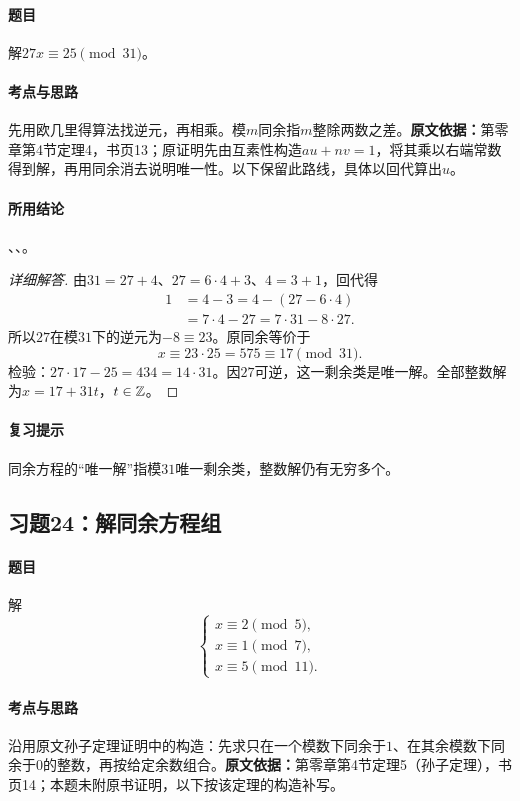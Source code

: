 \paragraph{题目}解$27x\equiv25\pmod{31}$。
\paragraph{考点与思路}先用欧几里得算法找逆元，再相乘。模$m$同余指$m$整除两数之差。\textbf{原文依据：}第零章第4节定理4，书页13；原证明先由互素性构造$au+nv=1$，将其乘以右端常数得到解，再用同余消去说明唯一性。以下保留此路线，具体以回代算出$u$。
\paragraph{所用结论}、、。
\begin{proof}[详细解答]
由$31=27+4$、$27=6\cdot4+3$、$4=3+1$，回代得
\begin{align*}
1&=4-3=4-(27-6\cdot4)\\
 &=7\cdot4-27=7\cdot31-8\cdot27.
\end{align*}
所以$27$在模$31$下的逆元为$-8\equiv23$。原同余等价于
\[
x\equiv23\cdot25=575\equiv17\pmod{31}.
\]
检验：$27\cdot17-25=434=14\cdot31$。因$27$可逆，这一剩余类是唯一解。全部整数解为$x=17+31t$，$t\in\mathbb Z$。
\end{proof}
\paragraph{复习提示}同余方程的“唯一解”指模$31$唯一剩余类，整数解仍有无穷多个。

\subsection{习题24：解同余方程组}\label{exercise:0:24}
\paragraph{题目}解
\[
\begin{cases}
x\equiv2\pmod5,\\x\equiv1\pmod7,\\x\equiv5\pmod{11}.
\end{cases}
\]
\paragraph{考点与思路}沿用原文孙子定理证明中的构造：先求只在一个模数下同余于$1$、在其余模数下同余于$0$的整数，再按给定余数组合。\textbf{原文依据：}第零章第4节定理5（孙子定理），书页14；本题未附原书证明，以下按该定理的构造补写。
